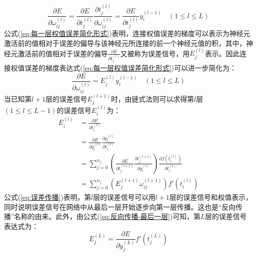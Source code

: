 \documentclass[a4paper]{ctexart}
\begin{document}
\begin{spacing}{1.3}
\begin{equation}
			\frac{\partial E}{\partial\omega_{ij}^{(l)}}=\frac{\partial E}{\partial t_j^{(l)}}\frac{\partial t_j^{(l)}}{\partial\omega_{ij}^{(l)}}=\frac{\partial E}{\partial t_j^{(l)}}y_i^{(l-1)}
			\quad
			(1\leq l\leq L)
	\end{equation}
	公式(\ref{eq:每一层权值误差简化形式})表明，连接权值误差的梯度可以表示为神经元激活前的值相对于误差的偏导与该神经元所连接的前一个神经元值的积，其中，神经元激活前的值相对于误差的偏导$\frac{\partial E}{\partial t_j^{(l)}}$又被称为误差信号\cite{RN130}\cite{RN131}，用$E_j^{(l)}$表示。因此连接权值误差的梯度表达式(\ref{eq:每一层权值误差简化形式})可以进一步简化为：
	\begin{equation}\label{eq:误差计算}
		\frac{\partial E}{\partial\omega_{ij}^{(l)}}=E_j^{(l)}y_i^{(l-1)}
		\quad
		(1\leq l\leq L)
	\end{equation}
	当已知第$l+1$层的误差信号$E_j^{(l+1)}$时，由链式法则可以求得第$l$层$(1\leq l\leq L-1)$的误差信号$E_i^{(l)}$为：
	\begin{equation}\label{eq:误差传播}
		\begin{split}
			E_i^{(l)}&=\frac{\partial E}{\partial t_i^{(l)}}\\
			&=\frac{\partial E}{\partial y_i^{(l)}}\frac{\partial y_i^{(l)}}{\partial t_i^{(l)}}\\
			&=\sum_{j=0}^{n_{j}}\left(\frac{\partial E}{\partial t_j^{(l+1)}}\frac{\partial t_j^{(l+1)}}{\partial y_i^{(l)}}\right)\frac{\partial f\left(t_i^{(l)}\right)}{\partial t_i^{(l)}}\\
			&=\sum_{j=0}^{n_{j}}\left(E_j^{(l+1)}\omega_{ij}^{(l+1)}\right)f'\left(t_i^{(l)}\right)
		\end{split}
	\end{equation}
	公式(\ref{eq:误差传播})表明，第$l$层的误差信号可以用$l+1$层的误差信号和权值表示，同时说明误差信号在网络中从最后一层开始逐步向第一层传播。这也是“反向传播”名称的由来。此外，由公式(\ref{eq:反向传播-最后一层})可知，第$L$层的误差信号表达式为：
	\begin{equation}\label{eq:最后一层误差信号}
		E_j^{(L)}=\frac{\partial E}{\partial y_j^{(L)}}f'\left(t_j^{(L)}\right)
	\end{equation}


\end{spacing}
\end{document}
